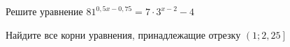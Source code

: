 \begin{ex}
	\begin{condition}
		\begin{enumcols}[label=\asbuk*)]
			\item Решите уравнение \( 81^{0,5x - 0,75} =  7\cdot 3^{x -2}-4 \)
			\item Найдите все корни уравнения, принадлежащие отрезку \(  \left(1;2,25\right]\)
		\end{enumcols}
	\end{condition}
\end{ex}